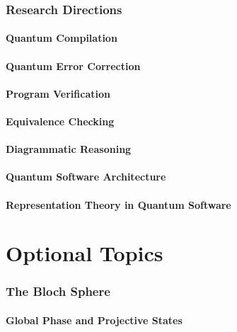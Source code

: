 \documentclass[11pt,a4paper]{article}
\begin{document}
\section{Research Directions}

\subsection{Quantum Compilation}

\subsection{Quantum Error Correction}

\subsection{Program Verification}

\subsection{Equivalence Checking}

\subsection{Diagrammatic Reasoning}

\subsection{Quantum Software Architecture}

\subsection{Representation Theory in Quantum Software}


\appendix

\part{Optional Topics}

\section{The Bloch Sphere}

\subsection{Global Phase and Projective States}
\end{document}
